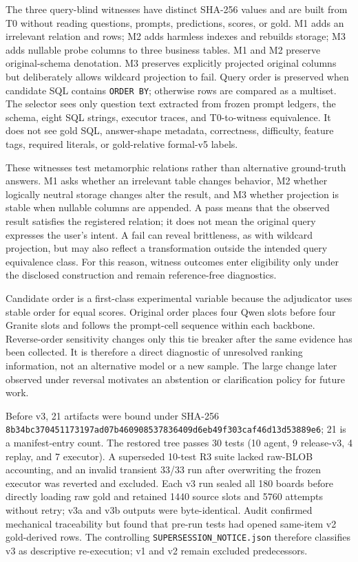 \documentclass[applsci,article,submit,moreauthors]{Definitions/mdpi}
\begin{document}
The three query-blind witnesses have distinct SHA-256 values and are built from T0 without reading questions, prompts, predictions, scores, or gold. M1 adds an irrelevant relation and rows; M2 adds harmless indexes and rebuilds storage; M3 adds nullable probe columns to three business tables. M1 and M2 preserve original-schema denotation. M3 preserves explicitly projected original columns but deliberately allows wildcard projection to fail. Query order is preserved when candidate SQL contains \texttt{ORDER BY}; otherwise rows are compared as a multiset. The selector sees only question text extracted from frozen prompt ledgers, the schema, eight SQL strings, executor traces, and T0-to-witness equivalence. It does not see gold SQL, answer-shape metadata, correctness, difficulty, feature tags, required literals, or gold-relative formal-v5 labels.

These witnesses test metamorphic relations rather than alternative ground-truth answers. M1 asks whether an irrelevant table changes behavior, M2 whether logically neutral storage changes alter the result, and M3 whether projection is stable when nullable columns are appended. A pass means that the observed result satisfies the registered relation; it does not mean the original query expresses the user's intent. A fail can reveal brittleness, as with wildcard projection, but may also reflect a transformation outside the intended query equivalence class. For this reason, witness outcomes enter eligibility only under the disclosed construction and remain reference-free diagnostics.

Candidate order is a first-class experimental variable because the adjudicator uses stable order for equal scores. Original order places four Qwen slots before four Granite slots and follows the prompt-cell sequence within each backbone. Reverse-order sensitivity changes only this tie breaker after the same evidence has been collected. It is therefore a direct diagnostic of unresolved ranking information, not an alternative model or a new sample. The large change later observed under reversal motivates an abstention or clarification policy for future work.

Before v3, 21 artifacts were bound under SHA-256 \nolinkurl{8b34bc370451173197ad07b460908537836409d6eb49f303caf46d13d53889e6}; 21 is a manifest-entry count. The restored tree passes 30 tests (10 agent, 9 release-v3, 4 replay, and 7 executor). A superseded 10-test R3 suite lacked raw-BLOB accounting, and an invalid transient 33/33 run after overwriting the frozen executor was reverted and excluded. Each v3 run sealed all 180 boards before directly loading raw gold and retained 1440 source slots and 5760 attempts without retry; v3a and v3b outputs were byte-identical. Audit confirmed mechanical traceability but found that pre-run tests had opened same-item v2 gold-derived rows. The controlling \texttt{SUPERSESSION\_NOTICE.json} therefore classifies v3 as descriptive re-execution; v1 and v2 remain excluded predecessors.
\end{document}
